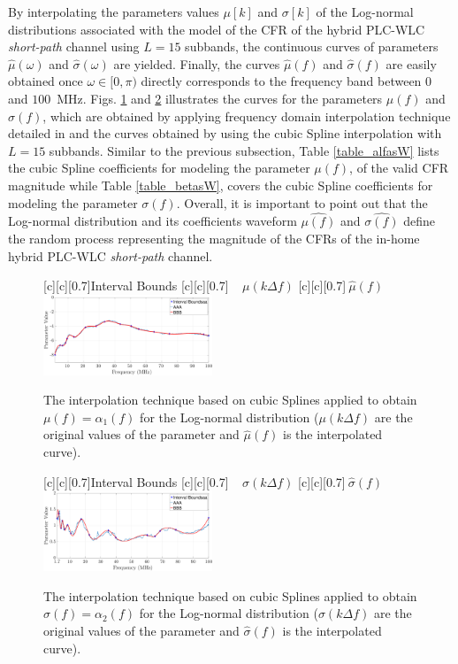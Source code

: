 \documentclass[journal]{IEEEtran}
\begin{document}
By interpolating the parameters values $\mu[k]$ and $\sigma[k]$ of the Log-normal distributions associated with the model of the \ac{CFR} of the hybrid \ac{PLC}-\ac{WLC} \textit{short-path} channel using $L=15$ subbands, the continuous curves of parameters $\hat{\mu}(\omega)$ and $\hat{\sigma}(\omega)$ are yielded. Finally, the curves $\hat{\mu}(f)$ and $\hat{\sigma}(f)$ are easily obtained once $\omega \in [0,\pi)$ directly corresponds to the frequency band between $0$ and $100$~MHz. Figs. \ref{Fit_alfasW} and \ref{Fit_betasW} illustrates the curves for the parameters $\mu(f)$ and $\sigma(f)$, which are obtained by applying frequency domain interpolation technique detailed in \cite{mitra} and the curves obtained by using the cubic Spline interpolation with $L=15$ subbands. Similar to the previous subsection, Table \ref{table_alfasW} lists the cubic Spline coefficients for modeling the parameter $\mu(f)$, of the valid \ac{CFR} magnitude while Table \ref{table_betasW}, covers the cubic Spline coefficients for modeling the parameter $\sigma(f)$. Overall, it is important to point out that the Log-normal distribution and its coefficients waveform $\hat{\mu(f)}$ and $\hat{\sigma(f)}$ define the random process representing the magnitude of the \acp{CFR} of the in-home hybrid \ac{PLC}-\ac{WLC} \textit{short-path} channel.

\begin{figure}[h]
	\centering
	[c][0.7]{Interval Bounds}
	[c][0.7]{$~~~~~\mu(k \Delta f)$}
	[c][0.7]{$~\hat{\mu}(f)$}
	\includegraphics[width=0.45\textwidth]{images/Alfa_fitsW.eps}
	\caption{The interpolation technique based on cubic Splines applied to obtain $\mu(f)=\alpha_1(f)$ for the Log-normal distribution (${\mu}(k \Delta f)$ are the original values of the parameter and $\hat{\mu}(f)$ is the interpolated curve).}
	\label{Fit_alfasW}
\end{figure}

\begin{figure}[h]
	\centering
	[c][0.7]{Interval Bounds}
	[c][0.7]{${~~~~~\sigma}(k \Delta f)$}
	[c][0.7]{$~\hat{\sigma}(f)$}
	\includegraphics[width=0.45\textwidth]{images/Beta_fitsW.eps}
	\caption{The interpolation technique based on cubic Splines applied to obtain $\sigma(f)=\alpha_2(f)$ for the Log-normal distribution (${\sigma}(k \Delta f)$ are the original values of the parameter and $\hat{\sigma}(f)$ is the interpolated curve).}
	\label{Fit_betasW}
\end{figure}
\end{document}
